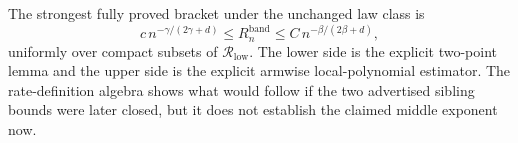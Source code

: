 The strongest fully proved bracket under the unchanged law class is
\[
c\,n^{-\gamma/(2\gamma+d)}\leq R_n^{\mathrm{band}}\leq
C\,n^{-\beta/(2\beta+d)},
\]
uniformly over compact subsets of \(\mathcal R_{\mathrm{low}}\).  The lower side is the explicit two-point lemma and the upper side is the explicit armwise local-polynomial estimator.  The rate-definition algebra shows what would follow if the two advertised sibling bounds were later closed, but it does not establish the claimed middle exponent now.